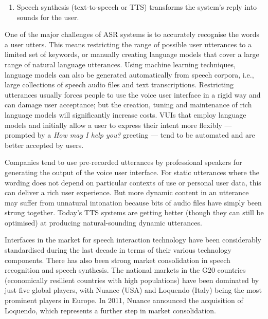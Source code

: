 \documentclass[]{../../metanetpaper}
\begin{document}
\begin{Parallel}[c]{77mm}{77mm}
{\begin{enumerate}
\item Speech synthesis (text-to-speech or TTS) transforms the system’s reply into
    sounds for the user.
\end{enumerate}

One of the major challenges of ASR systems is to accurately recognise the words
a user utters. This means restricting the range of possible user utterances to
a limited set of keywords, or manually creating language models that cover a
large range of natural language utterances. Using machine learning techniques,
language models can also be generated automatically from speech corpora, i.e.,
large collections of speech audio files and text transcriptions. Restricting
utterances usually forces people to use the voice user interface in a rigid way
and can damage user acceptance; but the creation, tuning and maintenance of
rich language models will significantly increase costs. VUIs that employ
language models and initially allow a user to express their intent more
flexibly — prompted by a \textit{How may I help you?} greeting — tend to be automated
and are better accepted by users.

Companies tend to use pre-recorded utterances by professional speakers for
generating the output of the voice user interface. For static utterances where
the wording does not depend on particular contexts of use or personal user
data, this can deliver a rich user experience. But more dynamic content in an
utterance may suffer from unnatural intonation because bits of audio files have
simply been strung together. Today’s TTS systems are getting better (though
they can still be optimised) at producing natural-sounding dynamic utterances.

Interfaces in the market for speech interaction technology have been
considerably standardised during the last decade in terms of their various
technology components. There has also been strong market consolidation in
speech recognition and speech synthesis. The national markets in the G20
countries (economically resilient countries with high populations) have been
dominated by just five global players, with Nuance (USA) and Loquendo (Italy)
being the most prominent players in Europe. In 2011, Nuance announced the
acquisition of Loquendo, which represents a further step in market
consolidation.

}
\end{Parallel}
\end{document}
